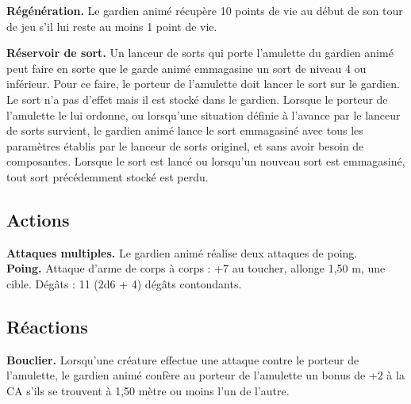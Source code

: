\begin{figure*}[hbp]
{\begin{minipage}[c]{.45\linewidth}
    {\bfseries Régénération.} Le gardien animé récupère 10 points de vie au début de son tour de jeu s'il 
               lui reste au moins 1 point de vie.
  \end{minipage}
  \hspace{4pt}
  \begin{minipage}[c]{.45\linewidth}
    {\bfseries Réservoir de sort.} Un lanceur de sorts qui porte l'amulette du gardien animé peut faire en 
               sorte que le garde animé emmagasine un sort de niveau 4 ou inférieur. Pour ce faire, le 
               porteur de l'amulette doit lancer le sort sur le gardien. Le sort n'a pas d'effet mais il 
               est stocké dans le gardien. Lorsque le porteur de l'amulette le lui ordonne, ou lorsqu'une 
               situation définie à l'avance par le lanceur de sorts survient, le gardien animé lance le 
               sort emmagasiné avec tous les paramètres établis par le lanceur de sorts originel, et sans 
               avoir besoin de composantes. Lorsque le sort est lancé ou lorsqu'un nouveau sort est 
               emmagasiné, tout sort précédemment stocké est perdu.
    \subsection*{Actions}
    {\bfseries Attaques multiples.} Le  gardien animé réalise deux attaques de poing.\\
    {\bfseries Poing.} Attaque d'arme de corps à corps : +7 au toucher, allonge 1,50 m, une cible. 
               Dégâts : 11 (2d6 + 4) dégâts contondants.
    \subsection*{Réactions}
    {\bfseries Bouclier.} Lorsqu'une créature effectue une attaque contre le porteur de l'amulette, le 
               gardien animé confère au porteur de l'amulette un bonus de +2 à la CA s'ils se trouvent à 
               1,50 mètre ou moins l'un de l'autre.
  \end{minipage}
}%
\end{figure*}


